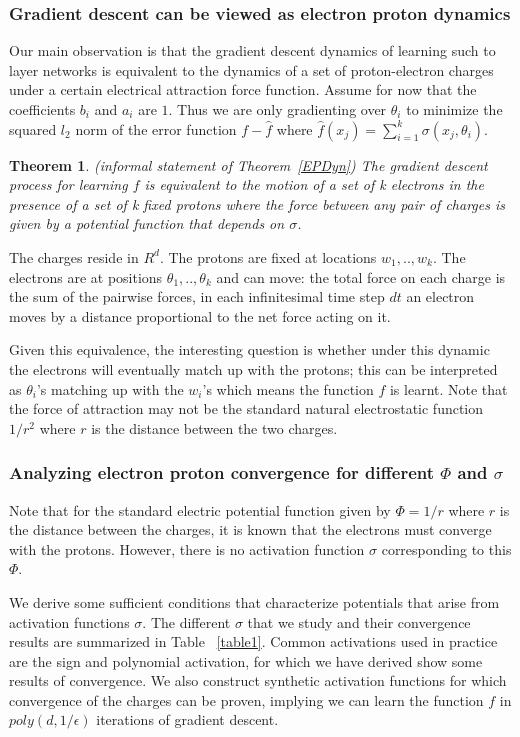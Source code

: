 \documentclass[11pt]{article}
\newtheorem{theorem}{Theorem}[section]
\begin{document}
\subsubsection{Gradient descent can be viewed as electron proton dynamics}
Our main observation is that the gradient descent dynamics of learning such to layer networks is equivalent to the dynamics of a set of proton-electron charges under a certain electrical attraction force function. Assume for now that the coefficients $b_i$ and $a_i$ are $1$. Thus we are only gradienting over $\theta_i$ to minimize the squared $l_2$ norm of the error function $f-\widehat{f}$ where $\widehat{f}(x_j) = \sum_{i=1}^k  \sigma(x_j,\theta_i)$.

\begin{theorem}(informal statement of Theorem~\ref{EPDyn})
The gradient descent process for learning $f$ is equivalent to the motion of a set of k electrons in the presence of a set of k fixed protons where the force between any pair of charges is given by a potential function that depends on $\sigma$.
\end{theorem}

The charges reside in $R^d$. The protons are fixed at locations $w_1,..,w_k$. The electrons are at positions $\theta_1,..,\theta_k$ and can move: the total force on each charge is the sum of the pairwise forces, in each infinitesimal time step $dt$ an electron moves by a distance proportional to the net force acting on it.

Given this equivalence, the interesting question is whether under this dynamic the electrons will eventually match up with the protons; this can be interpreted as $\theta_i$'s matching up with the $w_i$'s which means the function $f$ is learnt. Note that the force of attraction may not be the standard natural electrostatic function $1/r^2$ where $r$ is the distance between the two charges.


\subsubsection{Analyzing electron proton convergence for different $\Phi$ and $\sigma$}

Note that for the standard electric potential function given by $\Phi = 1/r$ where $r$ is the distance between the charges, it is known that the electrons must converge with the protons. However, there is no activation function $\sigma$ corresponding to this $\Phi$. 

We derive some sufficient conditions that characterize potentials that arise from activation functions $\sigma$. The different $\sigma$ that we study and their convergence results are summarized in Table ~\ref{table1}. Common activations used in practice are the sign and polynomial activation, for which we have derived show some results of convergence. We also construct synthetic activation functions for which convergence of the charges can be proven, implying we can learn the function $f$ in $poly(d,1/\epsilon)$ iterations of gradient descent.
\end{document}
